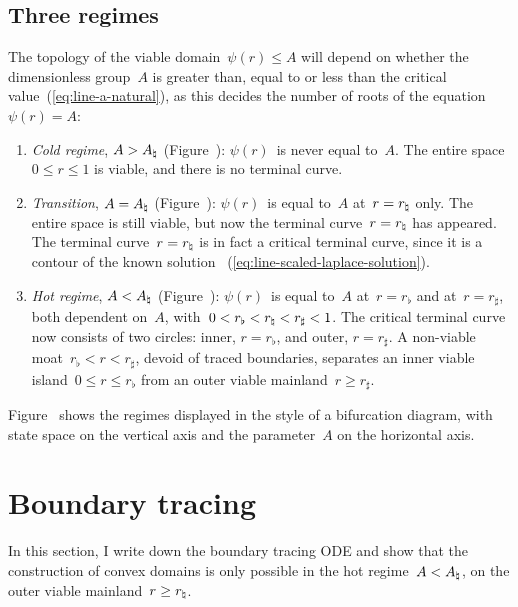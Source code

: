 \subsection{Three regimes}
\label{sec:polar.viable.regimes}

The topology of the viable domain~$\psi (r) \le A$ will depend
on whether the dimensionless group~$A$ is
greater than, equal to or less than
the critical value~(\ref{eq:line-a-natural}),
as this decides the number of roots of the equation~$\psi (r) = A$:
\begin{enumerate}
  \item
    \emph{Cold regime}, $A > A_\natural$ (Figure~\tbd):
    $\psi (r)$~is never equal to~$A$.
    The entire space~$0 \le r \le 1$ is viable,
    and there is no terminal curve.
  \item
    \emph{Transition}, $A = A_\natural$ (Figure~\tbd):
    $\psi (r)$~is equal to~$A$ at~$r = r_\natural$ only.
    The entire space is still viable,
    but now the terminal curve~$r = r_\natural$ has appeared.
    The terminal curve~$r = r_\natural$ is in fact a critical terminal curve,
    since it is a contour of the known solution~%
      (\ref{eq:line-scaled-laplace-solution}).
  \item
    \emph{Hot regime}, $A < A_\natural$ (Figure~\tbd):
    $\psi (r)$~is equal to~$A$ at~$r = r_\flat$
    and at~$r = r_\sharp$,
    both dependent on~$A$,
    with~$0 <  r_\flat < r_\natural < r_\sharp < 1$.
    The critical terminal curve now consists of two circles:
    inner, $r = r_\flat$, and outer, $r = r_\sharp$.
    A non-viable moat~$r_\flat < r < r_\sharp$,
    devoid of traced boundaries,
    separates an inner viable island~$0 \le r \le r_\flat$
    from an outer viable mainland~$r \ge r_\sharp$.
\end{enumerate}
Figure~\tbd{}
shows the regimes displayed in the style of a bifurcation diagram,
with state space on the vertical axis
and the parameter~$A$ on the horizontal axis.

\section{Boundary tracing}
\label{sec:polar.tracing}

In this section, I write down the boundary tracing ODE
and show that the construction of convex domains
is only possible in the hot regime~$A < A_\natural$,
on the outer viable mainland~$r \ge r_\natural$.

